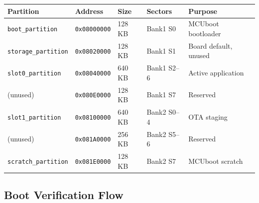 \documentclass[11pt,a4paper]{article}
\begin{document}
\begin{center}
\begin{tabular}{@{}lllll@{}}
\toprule
\textbf{Partition} & \textbf{Address} & \textbf{Size} & \textbf{Sectors} & \textbf{Purpose} \\
\midrule
\texttt{boot\_partition}    & \texttt{0x08000000} & 128 KB & Bank1 S0     & MCUboot bootloader \\
\texttt{storage\_partition} & \texttt{0x08020000} & 128 KB & Bank1 S1     & Board default, unused \\
\texttt{slot0\_partition}   & \texttt{0x08040000} & 640 KB & Bank1 S2--6  & Active application \\
(unused)                    & \texttt{0x080E0000} & 128 KB & Bank1 S7     & Reserved \\
\texttt{slot1\_partition}   & \texttt{0x08100000} & 640 KB & Bank2 S0--4  & OTA staging \\
(unused)                    & \texttt{0x081A0000} & 256 KB & Bank2 S5--6  & Reserved \\
\texttt{scratch\_partition} & \texttt{0x081E0000} & 128 KB & Bank2 S7     & MCUboot scratch \\
\bottomrule
\end{tabular}
\end{center}

\subsection{Boot Verification Flow}
\end{document}
